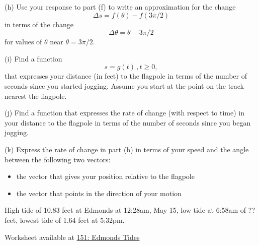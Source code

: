\documentclass{ximera}
\begin{document}
\begin{exercise}
(h) Use your response to part (f) to write an approximation for the change
\[
         \Delta s = f(\theta) - f(3\pi/2)
\]
in terms of the change 
\[
     \Delta \theta = \theta - 3\pi/2
\]
for values of $\theta$ near $\theta=3\pi/2$. 


(i) Find a function 
\[
   s = g(t) \, , t\geq 0,
\]
that expresses your distance (in feet) to the flagpole in terms of the number of seconds since you started jogging. Assume you start at the point on the track nearest the flagpole.

(j) Find a function that expresses the rate of change (with respect to time) in your distance to the flagpole in terms of the number of seconds since you began jogging.

(k) Express the rate of change in part (b) in terms of your speed and the angle between the following two vectors:

\begin{itemize}
\item{the vector that gives your position relative to the flagpole}

\item{the vector that points in the direction of your motion}
\end{itemize}
\end{exercise}


\begin{exercise} \label{Ex:4rett4t4}
High tide of 10.83 feet at Edmonds at 12:28am, May 15, low tide at 6:58am of ?? feet, lowest tide of 1.64 feet at 5:32pm.

\begin{onlineOnly}
    \begin{center}
\end{center}
\end{onlineOnly}

Worksheet available at \href{https://www.desmos.com/calculator/zta9tkzzmx}{151: Edmonds Tides}
\end{exercise}
\end{document}
